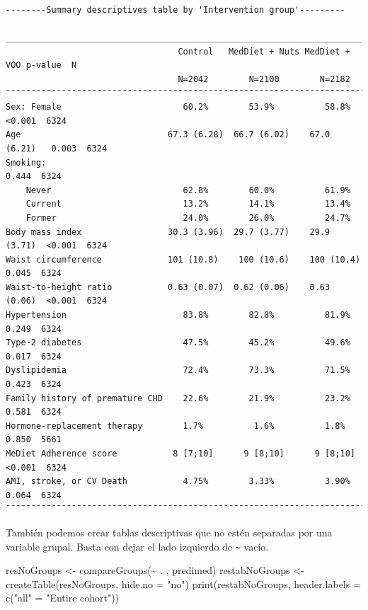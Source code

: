 \documentclass[
]{book}
\newenvironment{Shaded}{\begin{snugshade}}{\end{snugshade}}
\newcommand{\AttributeTok}[1]{\textcolor[rgb]{0.77,0.63,0.00}{#1}}
\newcommand{\FunctionTok}[1]{\textcolor[rgb]{0.00,0.00,0.00}{#1}}
\newcommand{\NormalTok}[1]{#1}
\newcommand{\OtherTok}[1]{\textcolor[rgb]{0.56,0.35,0.01}{#1}}
\newcommand{\SpecialCharTok}[1]{\textcolor[rgb]{0.00,0.00,0.00}{#1}}
\newcommand{\StringTok}[1]{\textcolor[rgb]{0.31,0.60,0.02}{#1}}
\begin{document}
\begin{verbatim}
--------Summary descriptives table by 'Intervention group'---------

_____________________________________________________________________________________ 
                                  Control   MedDiet + Nuts MedDiet + VOO p-value  N   
                                  N=2042        N=2100        N=2182                  
¯¯¯¯¯¯¯¯¯¯¯¯¯¯¯¯¯¯¯¯¯¯¯¯¯¯¯¯¯¯¯¯¯¯¯¯¯¯¯¯¯¯¯¯¯¯¯¯¯¯¯¯¯¯¯¯¯¯¯¯¯¯¯¯¯¯¯¯¯¯¯¯¯¯¯¯¯¯¯¯¯¯¯¯¯ 
Sex: Female                        60.2%        53.9%          58.8%     <0.001  6324 
Age                             67.3 (6.28)  66.7 (6.02)    67.0 (6.21)   0.003  6324 
Smoking:                                                                  0.444  6324 
    Never                          62.8%        60.0%          61.9%                  
    Current                        13.2%        14.1%          13.4%                  
    Former                         24.0%        26.0%          24.7%                  
Body mass index                 30.3 (3.96)  29.7 (3.77)    29.9 (3.71)  <0.001  6324 
Waist circumference             101 (10.8)    100 (10.6)    100 (10.4)    0.045  6324 
Waist-to-height ratio           0.63 (0.07)  0.62 (0.06)    0.63 (0.06)  <0.001  6324 
Hypertension                       83.8%        82.8%          81.9%      0.249  6324 
Type-2 diabetes                    47.5%        45.2%          49.6%      0.017  6324 
Dyslipidemia                       72.4%        73.3%          71.5%      0.423  6324 
Family history of premature CHD    22.6%        21.9%          23.2%      0.581  6324 
Hormone-replacement therapy        1.7%          1.6%          1.8%       0.850  5661 
MeDiet Adherence score           8 [7;10]      9 [8;10]      9 [8;10]    <0.001  6324 
AMI, stroke, or CV Death           4.75%        3.33%          3.90%      0.064  6324 
¯¯¯¯¯¯¯¯¯¯¯¯¯¯¯¯¯¯¯¯¯¯¯¯¯¯¯¯¯¯¯¯¯¯¯¯¯¯¯¯¯¯¯¯¯¯¯¯¯¯¯¯¯¯¯¯¯¯¯¯¯¯¯¯¯¯¯¯¯¯¯¯¯¯¯¯¯¯¯¯¯¯¯¯¯ 
\end{verbatim}

También podemos crear tablas descriptivas que no estén separadas por una variable grupal. Basta con dejar el lado izquierdo de \texttt{\textasciitilde{}} vacío.

\begin{Shaded}
\begin{Highlighting}[]
\NormalTok{resNoGroups }\OtherTok{\textless{}{-}} \FunctionTok{compareGroups}\NormalTok{(}\SpecialCharTok{\textasciitilde{}}\NormalTok{ . , predimed)}
\NormalTok{restabNoGroups }\OtherTok{\textless{}{-}} \FunctionTok{createTable}\NormalTok{(resNoGroups, }\AttributeTok{hide.no =} \StringTok{"no"}\NormalTok{)}
\FunctionTok{print}\NormalTok{(restabNoGroups, }\AttributeTok{header.labels =} \FunctionTok{c}\NormalTok{(}\StringTok{"all"} \OtherTok{=} \StringTok{"Entire cohort"}\NormalTok{))}
\end{Highlighting}
\end{Shaded}
\end{document}
